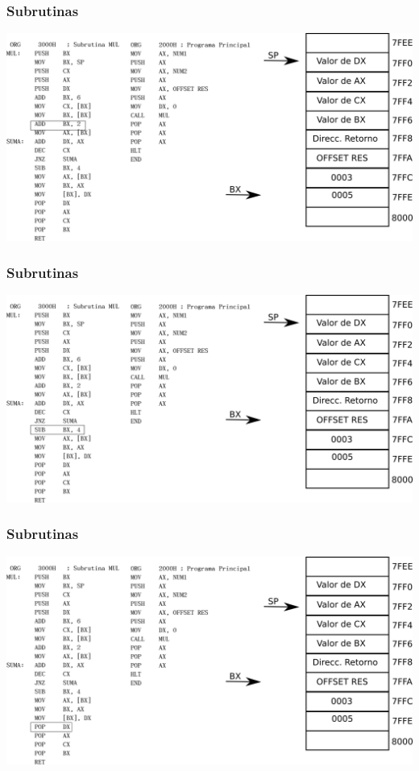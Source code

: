 \documentclass{beamer}
\begin{document}
\begin{frame}
\frametitle{Subrutinas}
\includegraphics[scale=0.70]{imgs/imagen_012.png}
\end{frame}

\begin{frame}
\frametitle{Subrutinas}
\includegraphics[scale=0.70]{imgs/imagen_013.png}
\end{frame}

\begin{frame}
\frametitle{Subrutinas}
\includegraphics[scale=0.70]{imgs/imagen_014.png}
\end{frame}
\end{document}
